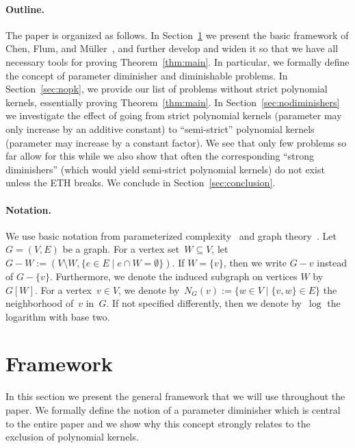 \documentclass[11pt,a4,USenglish]{article}
\theoremstyle{definition}
\theoremstyle{plain}
\theoremstyle{remark}
\newcommand{\appendixsection}[1]{%
%
}
\begin{document}
%
%
%
%

%
 
\iflong{}
%
\paragraph{Outline.}
The paper is organized as follows. In Section~\ref{sec:framework} we present the basic framework of Chen, Flum, and M\"{u}ller~\cite{chen2011lower}, and further develop and widen it so that we have all necessary tools for proving Theorem~\ref{thm:main}. In particular, we formally define the concept of parameter diminisher and diminishable problems. In Section~\ref{sec:nopk}, we provide our
list of problems without strict polynomial kernels, essentially
proving Theorem~\ref{thm:main}. In Section~\ref{sec:nodiminishers}
we investigate the effect of going from strict polynomial kernels
(parameter may only increase by an additive constant) to ``semi-strict''
polynomial kernels (parameter may increase by a constant factor). We see
that only few problems so far allow for this while we also show that often  
the corresponding ``strong diminishers'' (which would yield 
semi-strict polynomial kernels) do not exist unless the ETH breaks. 
We conclude in Section~\ref{sec:conclusion}.%
\fi{}


\paragraph{Notation.}
We use basic notation from parameterized complexity~\cite{cygan2015parameterized,DowneyF13,FlumG06,Niedermeier06} and graph theory~\cite{Diestel10,west}.
%
Let $G=(V,E)$ be a graph. For a vertex set~$W\subseteq V$, let $G-W:=(V\setminus W,\{e\in E\mid e\cap W=\emptyset\})$. 
If $W=\{v\}$, then we write $G-v$ instead of $G-\{v\}$. Furthermore, we denote the induced subgraph on vertices $W$ by $G[W]$.
For a vertex~$v\in V$, we denote by~$N_G(v):=\{w\in V\mid \{v,w\}\in E\}$ the neighborhood of~$v$ in~$G$.
%
If not specified differently, then we denote by~$\log$ the logarithm with base two.

\section{Framework}
\label{sec:framework}
\appendixsection{sec:framework}
%
%
%

In this section we present the general framework that we will use throughout the paper. We formally define the notion of a parameter diminisher which is central to the entire paper and we show why this concept strongly relates to the exclusion of polynomial kernels.
\end{document}
